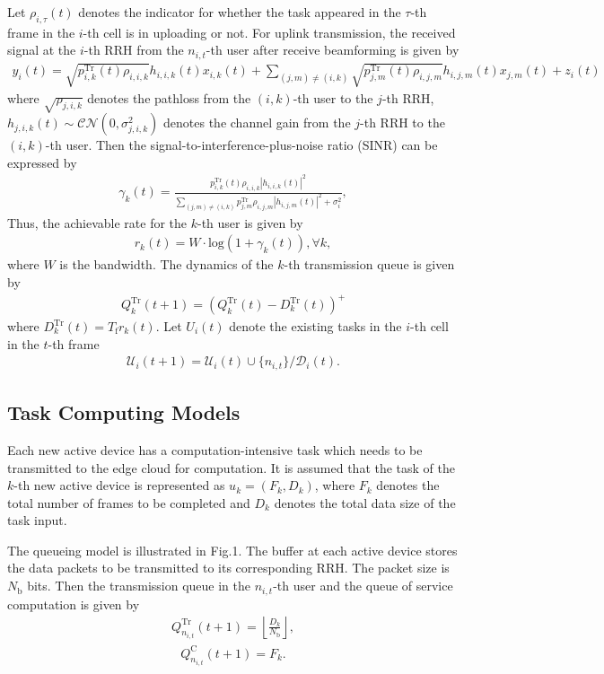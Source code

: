 \documentclass[journal, 12pt, onecolumn, draftclsnofoot]{IEEEtran}
\begin{document}
Let $\rho_{i,\tau}(t)$ denotes the indicator for whether the task appeared in the $\tau$-th frame in the $i$-th cell is in uploading or not.
For uplink transmission, the received signal at the $i$-th RRH from the $n_{i,t}$-th user after receive beamforming is given by
\begin{align}
	y_{i}(t) = \sqrt{p_{i,k}^{\mathrm{Tr}}(t)\rho_{i,i,k}}h_{i,i,k}(t)x_{i,k}(t)+\sum_{(j,m)\neq (i,k)}\sqrt{p_{j,m}^{\mathrm{Tr}}(t)\rho_{i,j,m}}h_{i,j,m}(t)x_{j,m}(t)+z_{i}(t)
\end{align}
where $\sqrt{\rho_{j,i,k}}$ denotes the pathloss from the $(i,k)$-th user to the $j$-th RRH, $h_{j,i,k}(t)\sim \mathcal{CN}(0,\sigma_{j,i,k}^{2})$ denotes the channel gain from the $j$-th RRH to the $(i,k)$-th user.
Then the signal-to-interference-plus-noise ratio (SINR) can be expressed by
\begin{align}
	\gamma_{k}(t)=\frac{p_{i,k}^{\mathrm{Tr}}(t)\rho_{i,i,k}|h_{i,i,k}(t)|^2}{\sum_{(j,m)\neq (i,k)}p_{j,m}^{\mathrm{Tr}}\rho_{i,j,m}|h_{i,j,m}(t)|^{2}+\sigma_{i}^{2}},
\end{align}
Thus, the achievable rate for the $k$-th user is given by
\begin{align}
	r_{k}(t)= W\cdot \text{log}(1+\gamma_{k}(t)), \forall k,
\end{align}
where $W$ is the bandwidth.
The dynamics of the $k$-th transmission queue is given by
\begin{align}
	Q_{k}^{\mathrm{Tr}}(t+1)=(Q_{k}^{\mathrm{Tr}}(t)-D_{k}^{\mathrm{Tr}}(t))^{+}
\end{align}
where $D_{k}^{\mathrm{Tr}}(t)=T_{\mathrm{f}}r_{k}(t)$.
Let ${U}_{i}(t)$ denote the existing tasks in the $i$-th cell in the $t$-th frame
\begin{align}
	\mathcal{U}_{i}(t+1)= \mathcal{U}_{i}(t)\cup\{n_{i,t}\}/\mathcal{D}_{i}(t).
\end{align}

\subsection{Task Computing Models}
Each new active device has a computation-intensive task which needs to be transmitted to the edge cloud for computation. It is assumed that the task of the $k$-th new active device is represented as $u_{k}=(F_{k},D_{k})$, where $F_{k}$ denotes the total number of frames to be completed and $D_{k}$ denotes the total data size of the task input.

The queueing model is illustrated in Fig.1.
The buffer at each active device stores the data packets to be transmitted to its corresponding RRH. The packet size is ${N_\mathrm{b}}$ bits. Then the transmission queue in the $n_{i,t}$-th user and the queue of service computation is given by
\begin{align}
	Q_{n_{i,t}}^{\mathrm{Tr}}(t+1)=\left\lfloor\frac{D_{k}}{N_\mathrm{b}}\right\rfloor,
\end{align}
\begin{align}
	Q_{n_{i,t}}^{\mathrm{C}}(t+1)=F_{k}.
\end{align}
\end{document}
